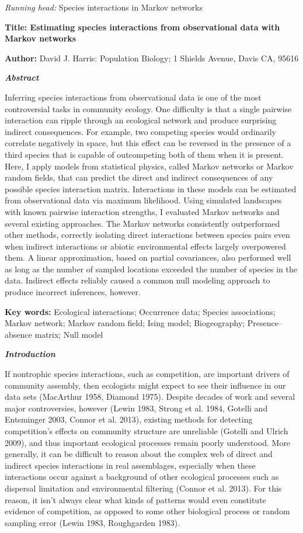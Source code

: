 \documentclass[12pt,]{article}
\date{}
\begin{document}
\begin{spacing}{1.9}
\begin{flushleft}
\emph{Running head:} Species interactions in Markov networks

\textbf{Title: Estimating species interactions from observational data
with Markov networks}

\textbf{Author:} David J. Harris: Population Biology; 1 Shields Avenue,
Davis CA, 95616

\textbf{\emph{Abstract}}

Inferring species interactions from observational data is one of the
most controversial tasks in community ecology. One difficulty is that a
single pairwise interaction can ripple through an ecological network and
produce surprising indirect consequences. For example, two competing
species would ordinarily correlate negatively in space, but this effect
can be reversed in the presence of a third species that is capable of
outcompeting both of them when it is present. Here, I apply models from
statistical physics, called Markov networks or Markov random fields,
that can predict the direct and indirect consequences of any possible
species interaction matrix. Interactions in these models can be
estimated from observational data via maximum likelihood. Using
simulated landscapes with known pairwise interaction strengths, I
evaluated Markov networks and several existing approaches. The Markov
networks consistently outperformed other methods, correctly isolating
direct interactions between species pairs even when indirect
interactions or abiotic environmental effects largely overpowered them.
A linear approximation, based on partial covariances, also performed
well as long as the number of sampled locations exceeded the number of
species in the data. Indirect effects reliably caused a common null
modeling approach to produce incorrect inferences, however.

\textbf{Key words:} Ecological interactions; Occurrence data; Species
associations; Markov network; Markov random field; Ising model;
Biogeography; Presence--absence matrix; Null model

\textbf{\emph{Introduction}}

If nontrophic species interactions, such as competition, are important
drivers of community assembly, then ecologists might expect to see their
influence in our data sets (MacArthur 1958, Diamond 1975). Despite
decades of work and several major controversies, however (Lewin 1983,
Strong et al. 1984, Gotelli and Entsminger 2003, Connor et al. 2013),
existing methods for detecting competition's effects on community
structure are unreliable (Gotelli and Ulrich 2009), and thus important
ecological processes remain poorly understood. More generally, it can be
difficult to reason about the complex web of direct and indirect species
interactions in real assemblages, especially when these interactions
occur against a background of other ecological processes such as
dispersal limitation and environmental filtering (Connor et al. 2013).
For this reason, it isn't always clear what kinds of patterns would even
constitute evidence of competition, as opposed to some other biological
process or random sampling error (Lewin 1983, Roughgarden 1983).


\end{flushleft}
\end{spacing}
\end{document}
